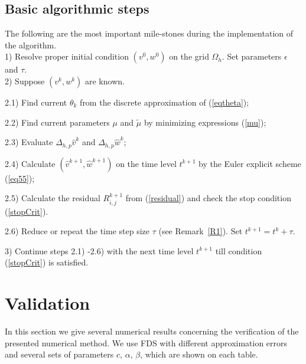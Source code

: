 \documentclass[preprint]{elsarticle}
\newcommand{\rf}[1]{(\ref{#1})}
\begin{document}
\subsection{Basic algorithmic steps}
The following are the most important mile-stones during the implementation of the algorithm.
\\
1) Resolve proper initial condition $(v^0, w^0)$ on the grid $\Omega_h$.  Set parameters $\epsilon$ and $\tau$.
\\
2) Suppose $(v^k, w^k)$ are known. 
\par
2.1) Find current $\theta_k$ from the discrete approximation of \rf{eqtheta};
\par
2.2) Find current  parameters $\mu$ and $ \tilde{\mu}$ by minimizing expressions \rf{mu};
\par
2.3) Evaluate $\Delta_{h,p}  \widehat{v}^k$ and $\Delta_{h,p}  \widehat{w}^k$;
\par
2.4) Calculate $(\widehat{v}^{k+1}, \widehat{w}^{k+1})$  on the  time level $t^{k+1}$ by the Euler explicit scheme   \rf{eq55};
\par
2.5) Calculate the residual $R^{k+1}_{i,j}$ from  \rf{residual} and check the stop condition \rf{stopCrit}.
\par
2.6) Reduce or repeat the time step size $\tau$  (see Remark~\ref{R1}). Set $t^{k+1}=t^{k}+\tau$.
 
3) Continue steps 2.1) -2.6) with the next time level $t^{k+1}$ till condition \rf{stopCrit} is satisfied.

\section{Validation}\label{validation}

In this section we give several numerical results concerning the verification of  the presented numerical method. 
 We use FDS with different approximation errors and several sets  of  parameters $c$, $\alpha$, $\beta$,  which are shown on each table. 
\end{document}
